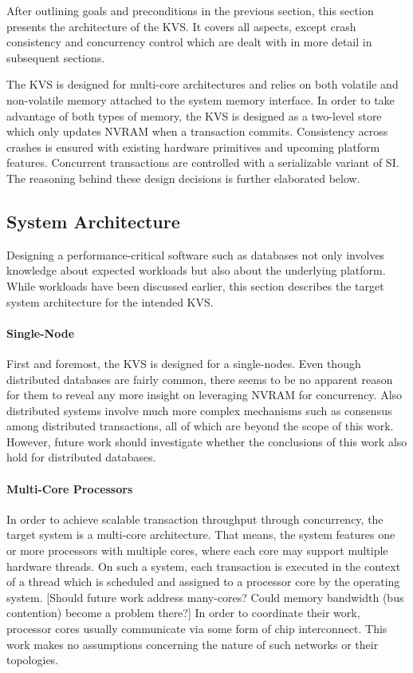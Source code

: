 After outlining goals and preconditions in the previous section, this section
presents the architecture of the KVS. It covers all aspects, except crash
consistency and concurrency control which are dealt with in more detail in
subsequent sections.

The KVS is designed for multi-core architectures and relies on both volatile and
non-volatile memory attached to the system memory interface. In order to take
advantage of both types of memory, the KVS is designed as a two-level store
which only updates NVRAM when a transaction commits. Consistency across crashes
is ensured with existing hardware primitives and upcoming platform features.
Concurrent transactions are controlled with a serializable variant of SI. The
reasoning behind these design decisions is further elaborated below.

\subsection{System Architecture}

Designing a performance-critical software such as databases not only involves
knowledge about expected workloads but also about the underlying platform. While
workloads have been discussed earlier, this section describes the target system
architecture for the intended KVS.

\paragraph{Single-Node}

First and foremost, the KVS is designed for a single-nodes. Even though
distributed databases are fairly common, there seems to be no apparent reason
for them to reveal any more insight on leveraging NVRAM for concurrency. Also
distributed systems involve much more complex mechanisms such as consensus among
distributed transactions, all of which are beyond the scope of this work.
However, future work should investigate whether the conclusions of this work
also hold for distributed databases.

\paragraph{Multi-Core Processors}

In order to achieve scalable transaction throughput through concurrency, the
target system is a multi-core architecture. That means, the system features one
or more processors with multiple cores, where each core may support multiple
hardware threads. On such a system, each transaction is executed in the context
of a thread which is scheduled and assigned to a processor core by the operating
system. [Should future work address many-cores? Could memory bandwidth (bus
contention) become a problem there?] In order to coordinate their work,
processor cores usually communicate via some form of chip interconnect. This
work makes no assumptions concerning the nature of such networks or their
topologies.

